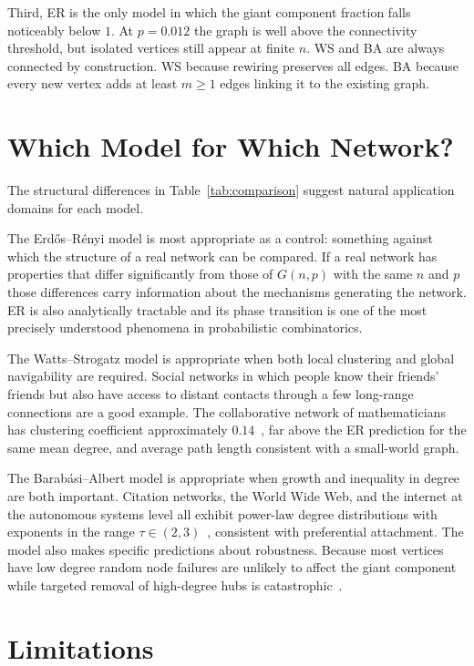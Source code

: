 \documentclass[12pt, a4paper]{report}
\theoremstyle{definition}
\theoremstyle{plain}
\theoremstyle{remark}
\begin{document}
Third, ER is the only model in which the giant component
fraction falls noticeably below $1$. At $p = 0.012$ the
graph is well above the connectivity threshold, but isolated
vertices still appear at finite $n$. WS and BA are always
connected by construction. WS because rewiring preserves all
edges. BA because every new vertex adds at least $m \ge 1$
edges linking it to the existing graph.

\section{Which Model for Which Network?}
\label{sec:comparison_which}

The structural differences in Table~\ref{tab:comparison}
suggest natural application domains for each model.

The Erdős--Rényi model is most appropriate as a control:
something against which the structure of a real network can
be compared. If a real network has properties that differ
significantly from those of $G(n,p)$ with the same $n$ and
$p$ those differences carry information about the mechanisms
generating the network. ER is also analytically tractable
and its phase transition is one of the most precisely
understood phenomena in probabilistic combinatorics.

The Watts--Strogatz model is appropriate when both local
clustering and global navigability are required. Social
networks in which people know their friends' friends but also
have access to distant contacts through a few long-range
connections are a good example. The collaborative network of
mathematicians has clustering coefficient
approximately $0.14$~\cite{hofstad2017}, far above the ER prediction
for the same mean degree, and average path length consistent with a
small-world graph.

The Barabási--Albert model is appropriate when growth and
inequality in degree are both important. Citation networks,
the World Wide Web, and the internet at the autonomous systems
level all exhibit power-law degree distributions with
exponents in the range $\tau \in (2, 3)$~\cite{albert2002},
consistent with preferential attachment. The model also
makes specific predictions about robustness. Because most
vertices have low degree random node failures are unlikely
to affect the giant component while targeted removal of
high-degree hubs is catastrophic~\cite{albert2002}.

\section{Limitations}
\label{sec:comparison_limitations}
\end{document}
